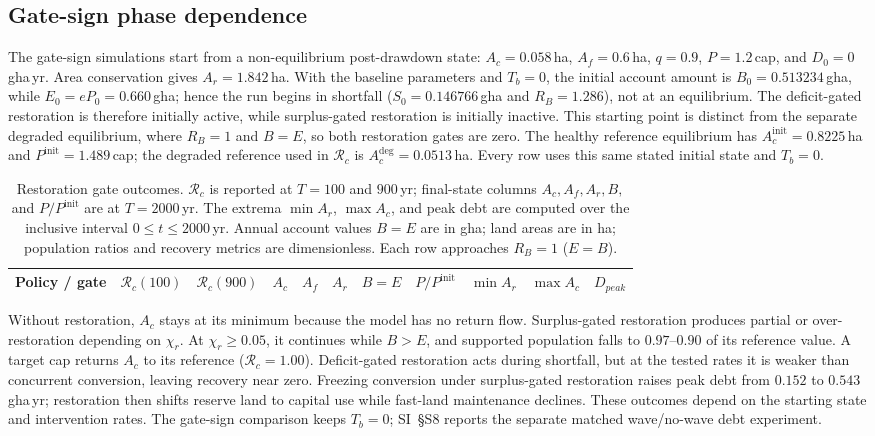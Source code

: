 \documentclass[11pt,a4paper]{article}
\begin{document}
\subsection{Gate-sign phase dependence}\label{si:gates}

The gate-sign simulations start from a non-equilibrium post-drawdown state: $A_c=0.058$\,ha, $A_f=0.6$\,ha, $q=0.9$, $P=1.2$\,cap, and $D_0=0$\,gha\,yr. Area conservation gives $A_r=1.842$\,ha. With the baseline parameters and $T_b=0$, the initial account amount is $B_0=0.513234$\,gha, while $E_0=eP_0=0.660$\,gha; hence the run begins in shortfall ($S_0=0.146766$\,gha and $R_B=1.286$), not at an equilibrium. The deficit-gated restoration is therefore initially active, while surplus-gated restoration is initially inactive. This starting point is distinct from the separate degraded equilibrium, where $R_B=1$ and $B=E$, so both restoration gates are zero. The healthy reference equilibrium has $A_c^{\mathrm{init}}=0.8225$\,ha and $P^{\mathrm{init}}=1.489$\,cap; the degraded reference used in $\mathcal R_c$ is $A_c^{\mathrm{deg}}=0.0513$\,ha. Every row uses this same stated initial state and $T_b=0$.

\begin{table}[H]
\centering\scriptsize
\setlength{\tabcolsep}{2pt}
\caption{Restoration gate outcomes. $\mathcal R_c$ is reported at $T=100$ and $900$\,yr; final-state columns $A_c,A_f,A_r,B,$ and $P/P^{\mathrm{init}}$ are at $T=2000$\,yr. The extrema $\min A_r$, $\max A_c$, and peak debt are computed over the inclusive interval $0\le t\le2000$\,yr. Annual account values $B=E$ are in gha; land areas are in ha; population ratios and recovery metrics are dimensionless. Each row approaches $R_B=1$ ($E=B$).}
\label{tab:si_gates}
\begin{tabular}{l r r r r r r r r r r}
\toprule
Policy / gate & $\mathcal R_c(100)$ & $\mathcal R_c(900)$ & $A_c$ & $A_f$ & $A_r$ & $B=E$ & $P/P^{\mathrm{init}}$ & $\min A_r$ & $\max A_c$ & $D_{peak}$ \\
\midrule


\end{tabular}
\end{table}

Without restoration, $A_c$ stays at its minimum because the model has no return flow. Surplus-gated restoration produces partial or over-restoration depending on $\chi_r$. At $\chi_r\ge0.05$, it continues while $B>E$, and supported population falls to $0.97$--$0.90$ of its reference value. A target cap returns $A_c$ to its reference ($\mathcal R_c=1.00$). Deficit-gated restoration acts during shortfall, but at the tested rates it is weaker than concurrent conversion, leaving recovery near zero. Freezing conversion under surplus-gated restoration raises peak debt from $0.152$ to $0.543$\,gha\,yr; restoration then shifts reserve land to capital use while fast-land maintenance declines. These outcomes depend on the starting state and intervention rates. The gate-sign comparison keeps $T_b=0$; SI~\S S8 reports the separate matched wave/no-wave debt experiment.\par
\end{document}
